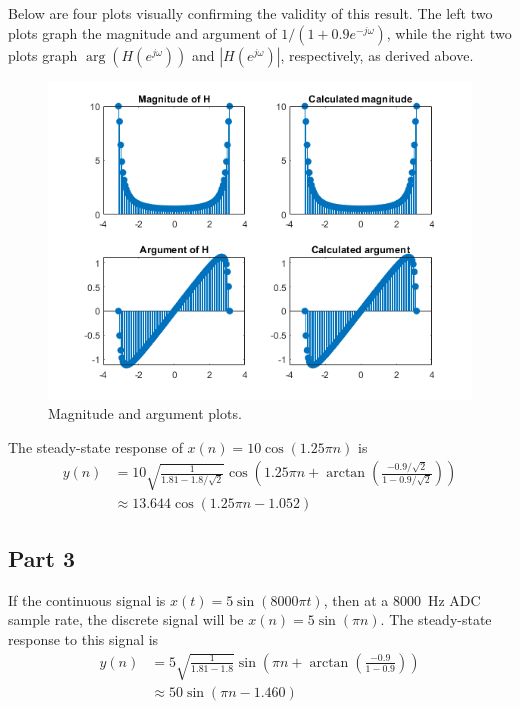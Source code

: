 \documentclass{article}
\begin{document}
Below are four plots visually confirming the validity of
this result. The left two plots graph the magnitude and argument
of \(1/(1 + 0.9e^{-j\omega})\), while the right two plots
graph \(\operatorname{arg}\left( H\left(e^{j\omega}\right) \right)\)
and \(\left| H\left(e^{j\omega}\right) \right|\), respectively,
as derived above.

\begin{figure}[H]
    \centering
    \includegraphics[width=\textwidth]{"Images/3-20"}
    \caption{Magnitude and argument plots.}
    \label{plot:3.20}
\end{figure}

The steady-state response of \(x(n) = 10\cos(1.25\pi n)\)
is
\begin{align*}
    y(n) &= 10\sqrt{\frac{1}{1.81 - 1.8/\sqrt2}} \cos\left( 1.25\pi n + \arctan\left( \frac{-0.9/\sqrt2}{1 - 0.9/\sqrt2} \right) \right)\\
    &\approx 13.644\cos(1.25\pi n - 1.052)
\end{align*}

\subsection*{Part 3}
If the continuous signal is \(x(t) = 5\sin(8000\pi t)\),
then at a \SI{8000}{\hertz} ADC sample rate, the discrete signal
will be \(x(n) = 5\sin(\pi n)\). The steady-state response to this
signal is
\begin{align*}
    y(n) &= 5\sqrt{\frac1{1.81 - 1.8}}\sin\left( \pi n + \arctan\left( \frac{-0.9}{1 - 0.9} \right) \right)\\
    &\approx 50\sin(\pi n - 1.460)
\end{align*}
\end{document}
